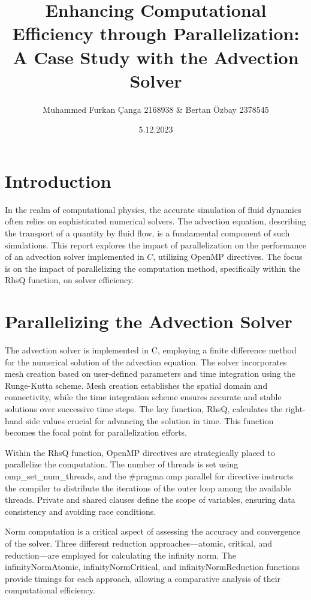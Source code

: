 \documentclass[10pt]{article}
\title{Enhancing Computational Efficiency through Parallelization: A Case Study with the Advection Solver }
\author{Muhammed Furkan Çanga 2168938  & Bertan Özbay 2378545}
\date{5.12.2023}
\begin{document}
\maketitle
\section{Introduction}
In the realm of computational physics, the accurate simulation of fluid dynamics often relies on sophisticated numerical solvers. The advection equation, describing the transport of a quantity by fluid flow, is a fundamental component of such simulations. This report explores the impact of parallelization on the performance of an advection solver implemented in $C$, utilizing OpenMP directives. The focus is on the impact of parallelizing the computation method, specifically within the RhsQ function, on solver efficiency.

\section{Parallelizing the Advection Solver}
The advection solver is implemented in $\mathrm{C}$, employing a finite difference method for the numerical solution of the advection equation. The solver incorporates mesh creation based on user-defined parameters and time integration using the Runge-Kutta scheme. Mesh creation establishes the spatial domain and connectivity, while the time integration scheme ensures accurate and stable solutions over successive time steps. The key function, RhsQ, calculates the right-hand side values crucial for advancing the solution in time. This function becomes the focal point for parallelization efforts.

Within the RhsQ function, OpenMP directives are strategically placed to parallelize the computation. The number of threads is set using omp\_set\_num\_threads, and the \#pragma omp parallel for directive instructs the compiler to distribute the iterations of the outer loop among the available threads. Private and shared clauses define the scope of variables, ensuring data consistency and avoiding race conditions.

Norm computation is a critical aspect of assessing the accuracy and convergence of the solver. Three different reduction approaches—atomic, critical, and reduction—are employed for calculating the infinity norm. The infinityNormAtomic, infinityNormCritical, and infinityNormReduction functions provide timings for each approach, allowing a comparative analysis of their computational efficiency.
\end{document}
